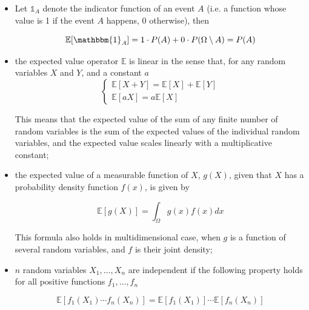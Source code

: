 \begin{itemize}
\tightlist
\item Let $\mathbb{1}_{A}$ denote the indicator function of an event $A$ (i.e. a function whose value is 1 if the event $A$ happens, 0 otherwise), then

\begin{equation}
\mathbb{E}[\mathbbm{1}_{A}] = 1\cdot P(A)+0\cdot P(\Omega \setminus A)= P(A)
\end{equation}

\item the expected value operator \(\mathbb{E}\) is linear in the sense that, for any random variables $X$ and $Y$, and a constant $a$
\begin{equation}
\begin{cases}
\mathbb{E}[X+Y] = \mathbb{E}[X] + \mathbb{E}[Y] \\
\mathbb{E}[aX] = a\mathbb{E}[X]
\end{cases}
\end{equation}

This means that the expected value of the sum of any finite number of random variables is the sum of the expected values of the individual random variables, and the expected value scales linearly with a multiplicative constant;

\item the expected value of a measurable function of $X$, $g(X)$, given that $X$ has a probability density function $f(x)$, is given by 

\begin{equation}
\mathbb{E}[g(X)] = \int_{\Omega}g(x)f(x) dx
\end{equation}

This formula also holds in multidimensional case, when $g$ is a function of several random variables, and $f$ is their joint density;

\item $n$ random variables $X_1 ,\ldots , X_n$ are independent if the following property holds for all positive functions $f_1 ,\ldots , f_n$

\begin{equation}
\mathbb{E}[f_1 (X_1 )\cdots f_n (X_n )] = \mathbb{E}[f_1 ( X_1 )] \cdots \mathbb{E}[f_n (X_n )]
\end{equation}
\end{itemize}


%



